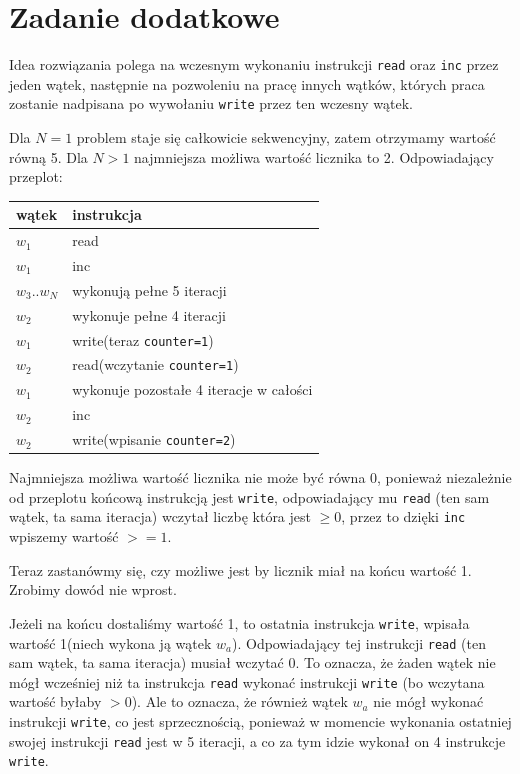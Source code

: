 \documentclass[11pt]{article}
\begin{document}
\section*{Zadanie dodatkowe}
\label{sec:org4227dfd}
Idea rozwiązania polega na wczesnym wykonaniu instrukcji \texttt{read} oraz \texttt{inc} przez jeden wątek,
następnie na pozwoleniu na pracę innych wątków, których praca zostanie nadpisana
po wywołaniu \texttt{write} przez ten wczesny wątek.


Dla \(N=1\) problem staje się całkowicie sekwencyjny, zatem otrzymamy wartość równą 5.
Dla \(N > 1\) najmniejsza możliwa wartość licznika to 2.
Odpowiadający przeplot:

\begin{center}
\begin{tabular}{ll}
wątek & instrukcja\\
\hline
\(w_1\) & read\\
\(w_1\) & inc\\
\(w_3\)..\(w_N\) & wykonują pełne 5 iteracji\\
\(w_2\) & wykonuje pełne 4 iteracji\\
\(w_1\) & write(teraz \texttt{counter=1})\\
\(w_2\) & read(wczytanie \texttt{counter=1})\\
\(w_1\) & wykonuje pozostałe 4 iteracje w całości\\
\(w_2\) & inc\\
\(w_2\) & write(wpisanie \texttt{counter=2})\\
\end{tabular}
\end{center}


Najmniejsza możliwa wartość licznika nie może być równa 0,
ponieważ niezależnie od przeplotu końcową instrukcją jest \texttt{write},
odpowiadający mu \texttt{read} (ten sam wątek, ta sama iteracja) wczytał liczbę
która jest \(\ge 0\), przez to dzięki \texttt{inc} wpiszemy wartość \(>=1\).

Teraz zastanówmy się, czy możliwe jest by licznik miał na końcu wartość 1.
Zrobimy dowód nie wprost.

Jeżeli na końcu dostaliśmy wartość 1, to ostatnia instrukcja \texttt{write}, wpisała
wartość 1(niech wykona ją wątek \(w_{a}\)).  Odpowiadający tej instrukcji \texttt{read}
(ten sam wątek, ta sama iteracja) musiał wczytać 0. To oznacza, że żaden wątek
nie mógł wcześniej niż ta instrukcja \texttt{read} wykonać instrukcji \texttt{write} (bo wczytana
wartość byłaby \(> 0\)). Ale to oznacza, że również wątek \(w_a\) nie mógł wykonać
instrukcji \texttt{write}, co jest sprzecznością, ponieważ w momencie wykonania ostatniej
swojej instrukcji \texttt{read} jest w 5 iteracji, a co za tym idzie wykonał on 4 instrukcje \texttt{write}.
\end{document}
